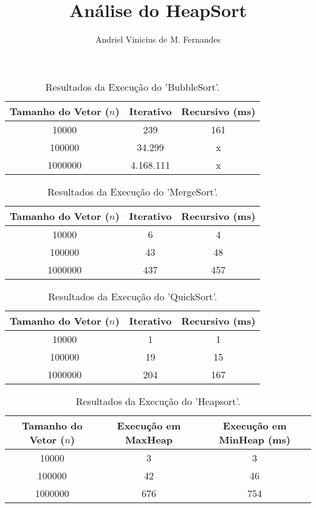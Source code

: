 \documentclass[12pt]{article}
\title{Análise do HeapSort}
\author{Andriel Vinicius de M. Fernandes}
\date{ }
\begin{document}
\maketitle
\begin{table}[ht]
    \centering
    \caption{Resultados da Execução do 'BubbleSort'.}
    \begin{tabular}{@{}ccc@{}}
        \toprule
        Tamanho do Vetor (\(n\)) & Iterativo & Recursivo (ms) \\ \midrule
        10000       & 239 & 161            \\
        100000      & 34.299 & x            \\
        1000000     & 4.168.111 & x           \\ \bottomrule
    \end{tabular}
\end{table}

\begin{table}[ht]
    \centering
    \caption{Resultados da Execução do 'MergeSort'.}
    \begin{tabular}{@{}ccc@{}}
        \toprule
        Tamanho do Vetor (\(n\)) & Iterativo & Recursivo (ms) \\ \midrule
        10000       & 6 & 4            \\
        100000      & 43 & 48            \\
        1000000     & 437  &  457         \\ \bottomrule
    \end{tabular}
\end{table}

\begin{table}[ht]
    \centering
    \caption{Resultados da Execução do 'QuickSort'.}
    \begin{tabular}{@{}ccc@{}}
        \toprule
        Tamanho do Vetor (\(n\)) & Iterativo & Recursivo (ms) \\ \midrule
        10000       & 1 & 1            \\
        100000      & 19 & 15            \\
        1000000     & 204 & 167          \\ \bottomrule
    \end{tabular}
\end{table}

\begin{table}[ht]
    \centering
    \caption{Resultados da Execução do 'Heapsort'.}
    \begin{tabular}{@{}ccc@{}}
        \toprule
        Tamanho do Vetor (\(n\)) & Execução em MaxHeap & Execução em MinHeap  (ms) \\ \midrule
        10000       & 3 & 3            \\
        100000      & 42 & 46            \\
        1000000     & 676 & 754           \\ \bottomrule
    \end{tabular}
\end{table}
\end{document}
